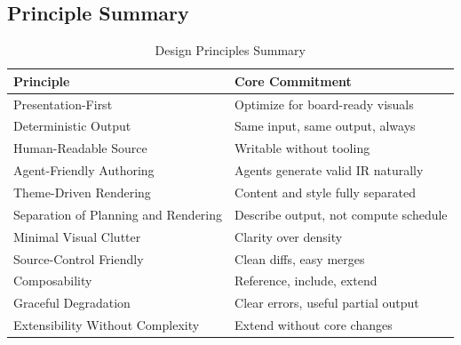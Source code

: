 \subsection{Principle Summary}

\begin{table}[h]
\centering
\caption{Design Principles Summary}
\begin{tabularx}{\textwidth}{lX}
\toprule
\textbf{Principle} & \textbf{Core Commitment} \\
\midrule
Presentation-First & Optimize for board-ready visuals \\
Deterministic Output & Same input, same output, always \\
Human-Readable Source & Writable without tooling \\
Agent-Friendly Authoring & Agents generate valid IR naturally \\
Theme-Driven Rendering & Content and style fully separated \\
Separation of Planning and Rendering & Describe output, not compute schedule \\
Minimal Visual Clutter & Clarity over density \\
Source-Control Friendly & Clean diffs, easy merges \\
Composability & Reference, include, extend \\
Graceful Degradation & Clear errors, useful partial output \\
Extensibility Without Complexity & Extend without core changes \\
\bottomrule
\end{tabularx}
\end{table}
